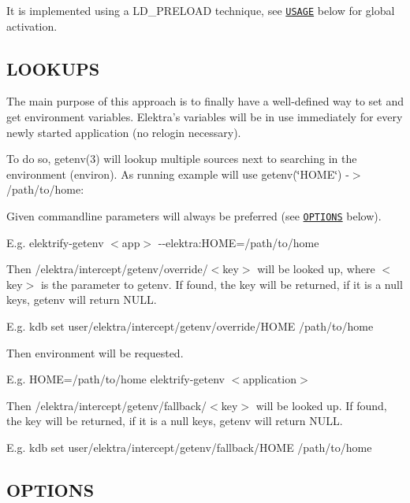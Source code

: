 It is implemented using a L\+D\+\_\+\+P\+R\+E\+L\+O\+A\+D technique, see \href{#USAGE}{\tt U\+S\+A\+G\+E} below for global activation.

\subsection*{L\+O\+O\+K\+U\+P\+S}

The main purpose of this approach is to finally have a well-\/defined way to set and get environment variables. Elektra's variables will be in use immediately for every newly started application (no relogin necessary).

To do so, getenv(3) will lookup multiple sources next to searching in the environment (environ). As running example will use {\ttfamily getenv(\char`\"{}\+H\+O\+M\+E\char`\"{}) -\/$>$ /path/to/home}\+:


\begin{DoxyEnumerate}
\item Given commandline parameters will always be preferred (see \href{#OPTIONS}{\tt O\+P\+T\+I\+O\+N\+S} below).

E.\+g. {\ttfamily elektrify-\/getenv $<$app$>$ -\/-\/elektra\+:H\+O\+M\+E=/path/to/home}
\item Then {\ttfamily /elektra/intercept/getenv/override/$<$key$>$} will be looked up, where $<$key$>$ is the parameter to {\ttfamily getenv}. If found, the key will be returned, if it is a null keys, {\ttfamily getenv} will return {\ttfamily N\+U\+L\+L}.

E.\+g. {\ttfamily kdb set user/elektra/intercept/getenv/override/\+H\+O\+M\+E /path/to/home}
\item Then environment will be requested.

E.\+g. {\ttfamily H\+O\+M\+E=/path/to/home elektrify-\/getenv $<$application$>$}
\item Then {\ttfamily /elektra/intercept/getenv/fallback/$<$key$>$} will be looked up. If found, the key will be returned, if it is a null keys, {\ttfamily getenv} will return {\ttfamily N\+U\+L\+L}.

E.\+g. {\ttfamily kdb set user/elektra/intercept/getenv/fallback/\+H\+O\+M\+E /path/to/home}
\end{DoxyEnumerate}

\subsection*{O\+P\+T\+I\+O\+N\+S}

